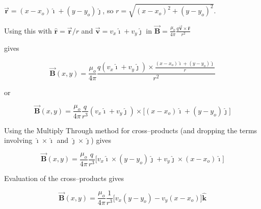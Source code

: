\documentclass{article}
\newcommand{\ds}[0]{\displaystyle}
\newcommand{\ihat}[0]{\hat{\boldsymbol{\imath}}}
\newcommand{\jhat}[0]{\hat{\boldsymbol{\jmath}}}
\newcommand{\khat}[0]{\hat{\boldsymbol{k}}}
\newcommand{\rhat}[0]{\hat{\mathbf{r}}}
\newcommand{\bfvec}[1]{\vec{\mathbf{#1}}}
\begin{document}
\begin{enumerate}
        $\bfvec{r} = (x-x_o)\ihat + (y-y_o)\jhat$, so $r=\sqrt{(x-x_o)^2+(y-y_o)^2}$.

        Using this with $\rhat=\bfvec{r}/r$ and $\bfvec{v}=v_x\ihat+v_y\jhat$ in
        $\ds\bfvec{B} = \frac{\mu_o}{4\pi}\frac{q\bfvec{v}\times\hat{\mathbf{r}}}{r^2}$

        gives

        $$
        \bfvec{B}(x,y) = \frac{\mu_o}{4\pi}\frac{q (v_x\ihat+v_y\jhat)\times\ds\frac{(x-x_o)\ihat + (y-y_o)\jhat}{r}}{r^2}
        $$

        or

        $$
        \bfvec{B}(x,y) = \frac{\mu_o}{4\pi}\frac{q}{r^3}(v_x\ihat+v_y\jhat)\times \big[(x-x_o)\ihat + (y-y_o)\jhat\big]
        $$

        Using the Multiply Through method for cross--products (and dropping the terms involving $\ihat\times\ihat$ and $\jhat\times\jhat$) gives

        $$
        \bfvec{B}(x,y) = \frac{\mu_o}{4\pi}\frac{q}{r^3}\big[v_x\ihat\times (y-y_o)\jhat + v_y\jhat\times (x-x_o)\ihat\big]
        $$

        Evaluation of the cross--products gives

        $$
        \bfvec{B}(x,y)= \frac{\mu_o}{4\pi} \frac{1}{r^3} \big[v_x(y-y_o) - v_y(x-x_o)\big]\khat
        $$
        \else

        \fi

\end{enumerate}
\end{document}
